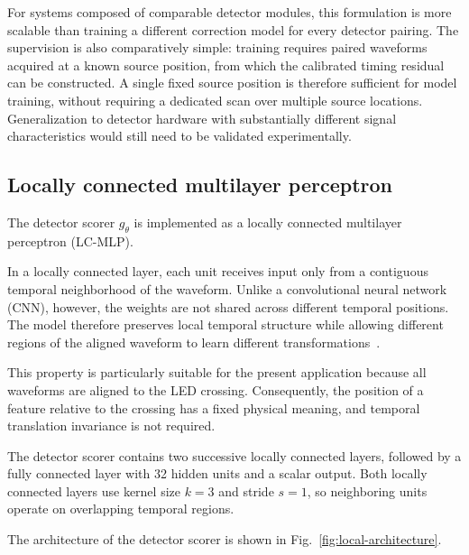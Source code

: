 For systems composed of comparable detector modules, this formulation is more scalable than training a different correction model for every detector pairing. The supervision is also comparatively simple: training requires paired waveforms acquired at a known source position, from which the calibrated timing residual can be constructed. A single fixed source position is therefore sufficient for model training, without requiring a dedicated scan over multiple source locations. Generalization to detector hardware with substantially different signal characteristics would still need to be validated experimentally.


\subsection{Locally connected multilayer perceptron}

The detector scorer \(g_\theta\) is implemented as a locally connected multilayer perceptron (LC-MLP).

In a locally connected layer, each unit receives input only from a contiguous temporal neighborhood of the waveform. 
Unlike a convolutional neural network (CNN), however, the weights are not shared across different temporal positions. 
The model therefore preserves local temporal structure while allowing different regions of the aligned waveform to learn 
different transformations~\cite{elsayed2020,amit2019}.

This property is particularly suitable for the present application because all waveforms are aligned to the LED crossing. 
Consequently, the position of a feature relative to the crossing has a fixed physical meaning, and temporal translation invariance is not required.

The detector scorer contains two successive locally connected layers, followed by a fully connected layer with 32 hidden units and a scalar output. 
Both locally connected layers use kernel size \(k=3\) and stride \(s=1\), so neighboring units operate on overlapping temporal regions.

The architecture of the detector scorer is shown in Fig.~\ref{fig:local-architecture}.

